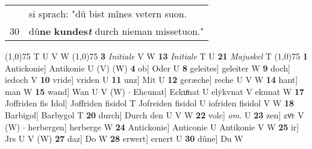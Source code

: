 \documentclass[8pt,a4paper,notitlepage]{article}
\begin{document}
\begin{table}[ht]
\begin{minipage}[t]{0.5\linewidth}
\begin{tabular}{rl}
 & si sprach: "dû bist mînes vetern suon.\\ 
30 & dû\textbf{ne} \textbf{kundes\textit{t}} durch nieman missetuon."\\ 
\end{tabular}
\scriptsize
\line(1,0){75} \newline
T U V W \newline
\line(1,0){75} \newline
\textbf{3} \textit{Initiale} V W  \textbf{13} \textit{Initiale} T U  \textbf{21} \textit{Majuskel} T  \newline
\line(1,0){75} \newline
\textbf{1} Antickonie] Antikonie U (V) (W) \textbf{4} ob] Oder U \textbf{8} geleites] geleiter W \textbf{9} doch] iedoch V \textbf{10} vride] vriden U \textbf{11} unz] Mit U \textbf{12} geræche] reche U V W \textbf{14} hant] man W \textbf{15} wand] Wan U V (W)  $\cdot$ Ehcunat] Eckuͦnat U elẏkvnat V ekunat W \textbf{17} Joffriden fis Idol] Joffriden fisidol T Jofreiden fisidol U iofriden fisidol V W \textbf{18} Barbigol] Barbygol T \textbf{20} durch] Durch den U V W \textbf{22} volc] \textit{om.} U \textbf{23} zen] zvͦr V (W)  $\cdot$ herbergen] herberge W \textbf{24} Antickonie] Anticonie U Antikonie V W \textbf{25} ir] Jrs U V (W) \textbf{27} daz] Do W \textbf{28} erwert] ernert U \textbf{30} dûne] Du W \newline
\end{minipage}
\end{table}
\end{document}
